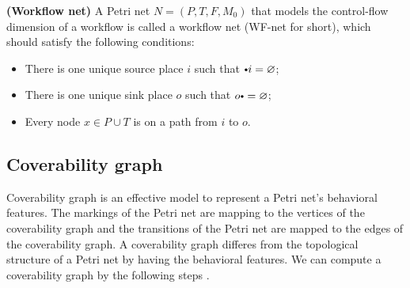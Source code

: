 \documentclass{llncs}
\begin{document}
\begin{definition}\label{def:WFNet}\textbf{(Workflow net)}
A Petri net $N=(P,T,F,M_{0})$ that models the control-flow dimension of a workflow is called a workflow net (WF-net for short), which should satisfy the following conditions:
\begin{itemize}
\item There is one unique source place $i$ such that $\vcenter{\hbox{\tiny$\bullet$}} i = \varnothing$;
\item There is one unique sink place $o$ such that $o \vcenter{\hbox{\tiny$\bullet$}} = \varnothing$;
\item Every node $x \in P \cup T$ is on a path from $i$ to $o$.
\end{itemize}
\end{definition}

\subsection{Coverability graph} 
Coverability graph is an effective model to represent a Petri net's behavioral features. The markings of the Petri net are mapping to the vertices of the coverability graph and the transitions of the Petri net are mapped to the edges of the coverability graph.
A coverability graph differes from the topological structure of a Petri net by having the behavioral features. We can compute a coverability graph by the following steps 
\cite{verbeek2004verification}. 
\end{document}
